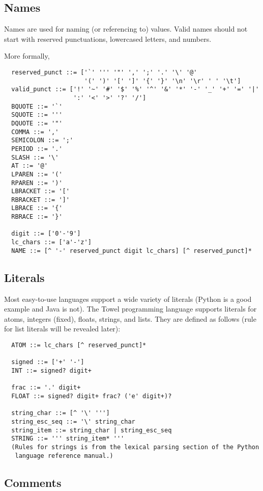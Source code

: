 \documentclass{book}
\begin{document}
\subsection{Names}

Names are used for naming (or referencing to) values. Valid names should not start with reserved punctuations, lowercased letters, and numbers.

More formally,
\begin{verbatim}
  reserved_punct ::= ['`' ''' '"' ',' ';' '.' '\' '@' 
                      '(' ')' '[' ']' '{' '}' '\n' '\r' ' ' '\t']
  valid_punct ::= ['!' '~' '#' '$' '%' '^' '&' '*' '-' '_' '+' '=' '|'
                   ':' '<' '>' '?' '/']
  BQUOTE ::= '`'
  SQUOTE ::= '''
  DQUOTE ::= '"'
  COMMA ::= ','
  SEMICOLON ::= ';'
  PERIOD ::= '.'
  SLASH ::= '\'
  AT ::= '@'
  LPAREN ::= '('
  RPAREN ::= ')'
  LBRACKET ::= '['
  RBRACKET ::= ']'
  LBRACE ::= '{'
  RBRACE ::= '}'

  digit ::= ['0'-'9']
  lc_chars ::= ['a'-'z']
  NAME ::= [^ '-' reserved_punct digit lc_chars] [^ reserved_punct]*
\end{verbatim}

\subsection{Literals}

Most easy-to-use languages support a wide variety of literals (Python is a good example and Java is not). The Towel programming language supports literals for atoms, integers (fixed), floats, strings, and lists. They are defined as follows (rule for list literals will be revealed later):
\begin{verbatim}
  ATOM ::= lc_chars [^ reserved_punct]*

  signed ::= ['+' '-']
  INT ::= signed? digit+

  frac ::= '.' digit+
  FLOAT ::= signed? digit+ frac? ('e' digit+)?

  string_char ::= [^ '\' ''']
  string_esc_seq ::= '\' string_char
  string_item ::= string_char | string_esc_seq
  STRING ::= ''' string_item* '''
  (Rules for strings is from the lexical parsing section of the Python
   language reference manual.)
\end{verbatim}

\subsection{Comments}
\end{document}
